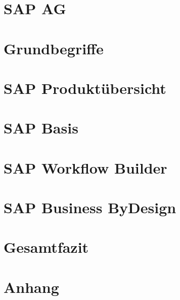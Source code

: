 \documentclass[12pt,pdftex,a4paper,oneside,ngerman]{scrreprt}
\begin{document}



%

\begingroup
	\pagestyle{empty} 
	\tableofcontents
	\listoffigures
	\listoftables
	\lstlistoflistings
\endgroup 

\chapter{SAP AG} \label{chap:sap}


\chapter{Grundbegriffe}  \label{chap:grundbegriffe}


\chapter{SAP Produktübersicht}  \label{chap:sap-produkte}


\chapter{SAP Basis}  \label{chap:sap-basis}


\chapter{SAP Workflow Builder}  \label{chap:builder}


\chapter{SAP Business ByDesign}  \label{chap:byd}


\chapter{Gesamtfazit}  \label{chap:fazit}


\appendix
\chapter{Anhang}  \label{chap:anhang}

\end{document}
